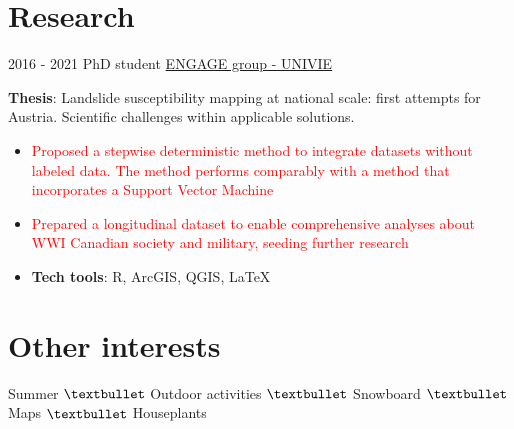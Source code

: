 \documentclass[letterpaper]{twentysecondcv} %
\begin{document}
\section{Research}
\begin{twenty}
	\twentyitem
    	{2016 - 2021}
		{}
        {PhD student}
        {\href{https://geographie.univie.ac.at/arbeitsgruppen/engage-geomorphologische-systeme-und-risikoforschung/}{ENGAGE group - UNIVIE}}
        {}
        {
       	\textbf{Thesis}: Landslide susceptibility mapping at national scale: first attempts for Austria. Scientific challenges within applicable solutions.
        {\begin{itemize}
        \item \textcolor{red}{Proposed a stepwise deterministic method to integrate datasets without labeled data. The method performs comparably with a method that incorporates a Support Vector Machine}
        \item \textcolor{red}{Prepared a longitudinal dataset to enable comprehensive analyses about WWI Canadian society and military, seeding further research}
        \item \textbf{Tech tools}: R, ArcGIS, QGIS, \large \LaTeX
		\end{itemize}}
        }
\end{twenty}

\section{Other interests}
\begin{center} Summer $\textbullet$ Outdoor activities $\textbullet$ Snowboard $\textbullet$ Maps $\textbullet$ Houseplants  \\ 
\vspace{2mm}
\faCoffee \hspace*{0.5cm} \faBeer \hspace*{0.5cm}\faSpotify \hspace*{0.5cm}\faSunO \hspace*{0.5cm}\faBicycle \hspace*{0.5cm}\faGraduationCap  \hspace*{0.5cm} \faMapMarker \hspace*{0.5cm}\faMap \hspace*{0.5cm}\faPlane \hspace*{0.5cm}\faRoad \hspace*{0.5cm}\faSignal \hspace*{0.5cm} \faLineChart  \hspace*{0.5cm}\faUniversity 
\end{center}

\end{document}
